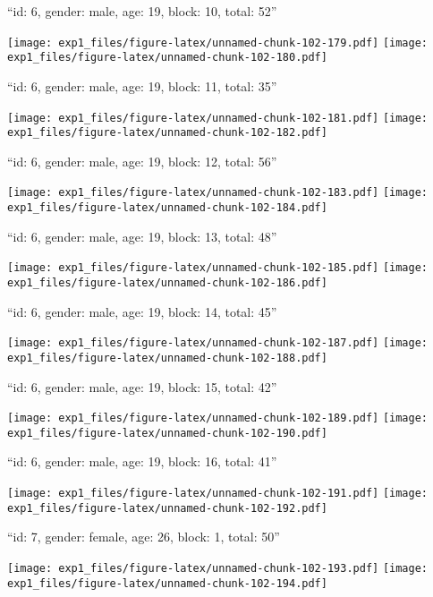 \documentclass[11pt,,]{article}
\begin{document}
\newpage
[1] 

``id: 6, gender: male, age: 19, block: 10, total: 52''

\texttt{[image: exp1\_files/figure-latex/unnamed-chunk-102-179.pdf]}
\texttt{[image: exp1\_files/figure-latex/unnamed-chunk-102-180.pdf]}

\newpage
[1] 

``id: 6, gender: male, age: 19, block: 11, total: 35''

\texttt{[image: exp1\_files/figure-latex/unnamed-chunk-102-181.pdf]}
\texttt{[image: exp1\_files/figure-latex/unnamed-chunk-102-182.pdf]}

\newpage
[1] 

``id: 6, gender: male, age: 19, block: 12, total: 56''

\texttt{[image: exp1\_files/figure-latex/unnamed-chunk-102-183.pdf]}
\texttt{[image: exp1\_files/figure-latex/unnamed-chunk-102-184.pdf]}

\newpage
[1] 

``id: 6, gender: male, age: 19, block: 13, total: 48''

\texttt{[image: exp1\_files/figure-latex/unnamed-chunk-102-185.pdf]}
\texttt{[image: exp1\_files/figure-latex/unnamed-chunk-102-186.pdf]}

\newpage
[1] 

``id: 6, gender: male, age: 19, block: 14, total: 45''

\texttt{[image: exp1\_files/figure-latex/unnamed-chunk-102-187.pdf]}
\texttt{[image: exp1\_files/figure-latex/unnamed-chunk-102-188.pdf]}

\newpage
[1] 

``id: 6, gender: male, age: 19, block: 15, total: 42''

\texttt{[image: exp1\_files/figure-latex/unnamed-chunk-102-189.pdf]}
\texttt{[image: exp1\_files/figure-latex/unnamed-chunk-102-190.pdf]}

\newpage
[1] 

``id: 6, gender: male, age: 19, block: 16, total: 41''

\texttt{[image: exp1\_files/figure-latex/unnamed-chunk-102-191.pdf]}
\texttt{[image: exp1\_files/figure-latex/unnamed-chunk-102-192.pdf]}

\newpage
[1] 

``id: 7, gender: female, age: 26, block: 1, total: 50''

\texttt{[image: exp1\_files/figure-latex/unnamed-chunk-102-193.pdf]}
\texttt{[image: exp1\_files/figure-latex/unnamed-chunk-102-194.pdf]}
\end{document}
